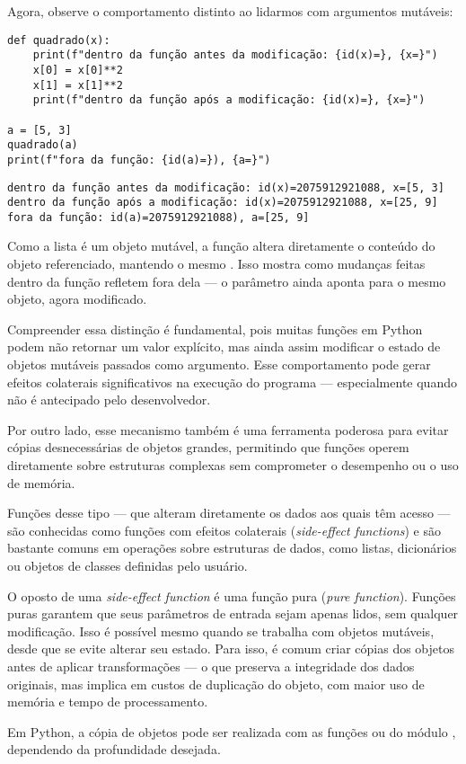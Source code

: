 Agora, observe o comportamento distinto ao lidarmos com argumentos mutáveis:
\begin{verbatim}
def quadrado(x):
    print(f"dentro da função antes da modificação: {id(x)=}, {x=}")
    x[0] = x[0]**2
    x[1] = x[1]**2
    print(f"dentro da função após a modificação: {id(x)=}, {x=}")

a = [5, 3]
quadrado(a)
print(f"fora da função: {id(a)=}), {a=}")
\end{verbatim}
\begin{verbatim}
dentro da função antes da modificação: id(x)=2075912921088, x=[5, 3]
dentro da função após a modificação: id(x)=2075912921088, x=[25, 9]
fora da função: id(a)=2075912921088), a=[25, 9]
\end{verbatim}

Como a lista é um objeto mutável, a função altera diretamente o conteúdo do objeto referenciado,
mantendo o mesmo .
Isso mostra como mudanças feitas dentro da função refletem fora dela --- o parâmetro ainda aponta para o mesmo objeto,
agora modificado.


Compreender essa distinção é fundamental, pois muitas funções em Python podem não retornar um valor explícito, mas
ainda assim modificar o estado de objetos mutáveis passados como argumento.
Esse comportamento pode gerar efeitos colaterais significativos na execução do programa --- especialmente quando
não é antecipado pelo desenvolvedor.


Por outro lado, esse mecanismo também é uma ferramenta poderosa para evitar cópias desnecessárias de objetos grandes,
permitindo que funções operem diretamente sobre estruturas complexas sem comprometer o desempenho ou o uso de memória.


Funções desse tipo --- que alteram diretamente os dados aos quais têm acesso --- são conhecidas como funções com
efeitos colaterais (\emph{side-effect functions}) e são bastante comuns em operações sobre estruturas de dados,
como listas, dicionários ou objetos de classes definidas pelo usuário.

O oposto de uma \emph{side-effect function} é uma função pura (\emph{pure function}).
Funções puras garantem que seus parâmetros de entrada sejam apenas lidos, sem qualquer modificação.
Isso é possível mesmo quando se trabalha com objetos mutáveis, desde que se evite alterar seu estado.
Para isso, é comum criar cópias dos objetos antes de aplicar transformações --- o que preserva a integridade dos
dados originais, mas implica em custos de duplicação do objeto, com maior uso de memória e tempo de processamento.

Em Python, a cópia de objetos pode ser realizada com as funções  ou  do módulo
, dependendo da profundidade desejada.




